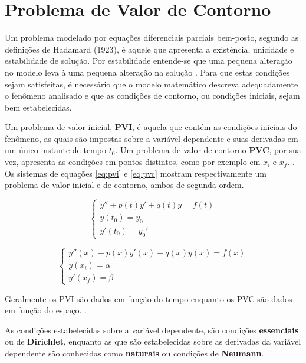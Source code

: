 \section{Problema de Valor de Contorno}


Um problema modelado por equações diferenciais parciais bem-posto, segundo as definições de Hadamard (1923), é aquele que 	apresenta a existência, unicidade e estabilidade de solução. Por estabilidade entende-se que uma pequena alteração no modelo leva à uma pequena alteração na solução \citep[p. 18]{moh}. Para que estas condições sejam satisfeitas, é necessário que o modelo matemático descreva adequadamente o fenômeno analisado e que as condições de contorno, ou condições iniciais, sejam bem estabelecidas.

Um problema de valor inicial, \textbf{PVI}, é aquela que contém as condições iniciais do fenômeno, as quais são impostas sobre a variável dependente e suas derivadas em um único instante de tempo $t_0$. Um problema de valor de contorno \textbf{PVC}, por sua vez, apresenta as condições em pontos distintos, como por exemplo em $x_i$ e $x_f$. \citep[p. 447]{boyce_diprima}. Os sistemas de equações \ref{eq:pvi} e \ref{eq:pvc} mostram respectivamente um problema de valor inicial e de contorno, ambos de segunda ordem.

\begin{equation}
	\label{eq:pvi}
	\begin{cases}
		y'' + p(t)y' + q(t)y = f(t) \\
		y(t_0) = y_0 \\
		y'(t_0) = y_0'
	\end{cases}
\end{equation}


\begin{equation}
	\label{eq:pvc}
	\begin{cases}
		y''(x) + p(x)y'(x) + q(x)y(x) = f(x) \\
		y(x_i) = \alpha \\
		y'(x_f) = \beta
	\end{cases}
\end{equation}

Geralmente os PVI são dados em função do tempo enquanto os PVC são dados em função do espaço. \citep[p. 447]{boyce_diprima}.

As condições estabelecidas sobre a variável dependente, são condições \textbf{essenciais} ou de \textbf{Dirichlet}, enquanto as que são estabelecidas sobre as derivadas da variável dependente são  conhecidas como \textbf{naturais} ou condições de \textbf{Neumann}.

